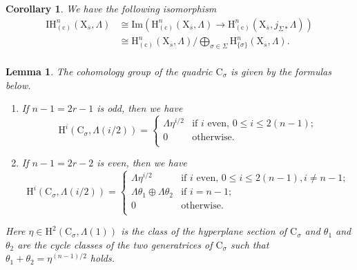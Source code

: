 \documentclass[10pt,a4paper]{amsart}
\newtheorem{corollary}{Corollary}
\newtheorem{lemma}{Lemma}
\def\rmC{\mathrm{C}}
\def\rmH{\mathrm{H}}
\def\rmX{\mathrm{X}}
\def\rmc{\mathrm{c}}
\begin{document}
\begin{corollary}\label{intersection}
We have the following isomorphism
\begin{equation*}
\begin{aligned}
\mathrm{IH}^{n}_{(\rmc)}(\rmX_{\overline{s}}, \Lambda)&\cong\mathrm{Im}(\mathrm{H}^{n}_{(\rmc)}(\rmX_{\overline{s}}, \Lambda)\rightarrow \mathrm{H}^{n}_{(\rmc)}(\rmX_{\overline{s}}, j_{\Sigma\ast}\Lambda))\\
&\cong\mathrm{H}^{n}_{(\rmc)}(\rmX_{\overline{s}}, \Lambda)/\bigoplus\limits_{\sigma\in\Sigma}\rmH^{n}_{\{\sigma\}}(\rmX_{\overline{s}}, \Lambda).\\
\end{aligned}
\end{equation*}
\end{corollary}

\begin{lemma}\label{quadric-class}
The cohomology group of the quadric $\rmC_{\sigma}$ is given by the formulas below.
\begin{enumerate}
\item If $n-1=2r-1$ is odd, then we have 
\begin{equation*}
\rmH^{i}(\rmC_{\sigma}, \Lambda(i/2))=\begin{cases}\Lambda\eta^{i/2} & \text{if $i$ even, $0\leq i\leq 2(n-1)$;}\\ 0 & \text{otherwise.}\\ \end{cases}
\end{equation*}
\item If $n-1=2r-2$ is even, then we have 
\begin{equation*}
\rmH^{i}(\rmC_{\sigma}, \Lambda(i/2))=\begin{cases}\Lambda\eta^{i/2} & \text{if $i$ even, $0\leq i\leq 2(n-1), i\neq n-1$;}\\   \Lambda\theta_{1}\oplus\Lambda\theta_{2} & \text{if $i=n-1$;}\\0 & \text{otherwise.}\\ \end{cases}
\end{equation*}
\end{enumerate}
Here $\eta\in \rmH^{2}(\rmC_{\sigma},\Lambda(1))$ is the class of the hyperplane section of $\rmC_{\sigma}$ and $\theta_{1}$ and $\theta_{2}$ are the cycle classes of the two generatrices of $\rmC_{\sigma}$ such that $\theta_{1}+\theta_{2}=\eta^{(n-1)/2}$ holds.
\end{lemma}
\end{document}
